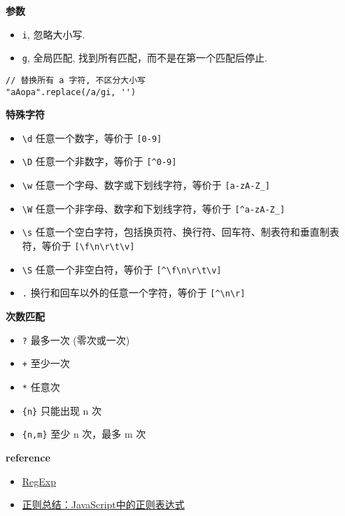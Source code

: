 \textbf{参数}

\begin{itemize}
\tightlist
\item
  \lstinline!i!, 忽略大小写.
\item
  \lstinline!g!, 全局匹配, 找到所有匹配，而不是在第一个匹配后停止.
\end{itemize}

\begin{lstlisting}
// 替换所有 a 字符, 不区分大小写
"aAopa".replace(/a/gi, '')
\end{lstlisting}

\textbf{特殊字符}

\begin{itemize}
\tightlist
\item
  \lstinline!\d! 任意一个数字，等价于 \lstinline![0-9]!
\item
  \lstinline!\D! 任意一个非数字，等价于 \lstinline![^0-9]!
\item
  \lstinline!\w! 任意一个字母、数字或下划线字符，等价于
  \lstinline![a-zA-Z_]!
\item
  \lstinline!\W! 任意一个非字母、数字和下划线字符，等价于
  \lstinline![^a-zA-Z_]!
\item
  \lstinline!\s!
  任意一个空白字符，包括换页符、换行符、回车符、制表符和垂直制表符，等价于
  \lstinline![\f\n\r\t\v]!
\item
  \lstinline!\S! 任意一个非空白符，等价于 \lstinline![^\f\n\r\t\v]!
\item
  \lstinline!.! 换行和回车以外的任意一个字符，等价于 \lstinline![^\n\r]!
\end{itemize}

\textbf{次数匹配}

\begin{itemize}
\tightlist
\item
  \lstinline!?! 最多一次 (零次或一次)
\item
  \lstinline!+! 至少一次
\item
  \lstinline!*! 任意次
\item
  \lstinline!{n}! 只能出现 n 次
\item
  \lstinline!{n,m}! 至少 n 次，最多 m 次
\end{itemize}

\textbf{reference}

\begin{itemize}
\tightlist
\item
  \href{https://developer.mozilla.org/zh-CN/docs/Web/JavaScript/Reference/Global_Objects/RegExp}{RegExp}
\item
  \href{http://www.nowamagic.net/librarys/veda/detail/1283}{正则总结：JavaScript中的正则表达式}
\end{itemize}

